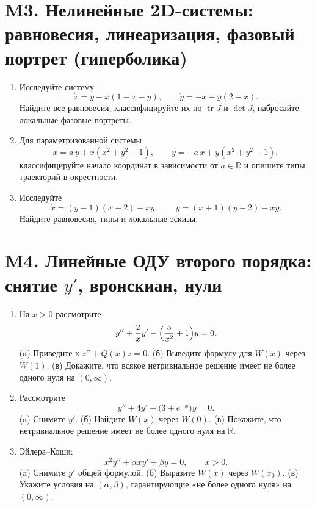 \documentclass[12pt]{article}
\begin{document}
\section*{M3. Нелинейные 2D-системы: равновесия, линеаризация, фазовый портрет (гиперболика)}
\begin{enumerate}
\item Исследуйте систему
\[
\dot x = y - x(1-x-y),\qquad
\dot y = -x + y(2-x).
\]
Найдите все равновесия, классифицируйте их по $\operatorname{tr}J$ и $\det J$, набросайте локальные фазовые портреты.

\item Для параметризованной системы
\[
\dot x = a\,y + x(x^2+y^2-1),\qquad
\dot y = -a\,x + y(x^2+y^2-1),
\]
классифицируйте начало координат в зависимости от $a\in\mathbb{R}$ и опишите типы траекторий в окрестности.

\item Исследуйте
\[
\dot x = (y-1)(x+2)-xy,\qquad
\dot y = (x+1)(y-2)-xy.
\]
Найдите равновесия, типы и локальные эскизы.
\end{enumerate}

\section*{M4. Линейные ОДУ второго порядка: снятие $y'$, вронскиан, нули}
\begin{enumerate}
\item На $x>0$ рассмотрите
\[
y''+\frac{2}{x}y' -\Bigl(\frac{5}{x^2}+1\Bigr)y=0.
\]
(a) Приведите к $z''+Q(x)z=0$. (б) Выведите формулу для $W(x)$ через $W(1)$. (в) Докажите, что всякое нетривиальное решение имеет не более одного нуля на $(0,\infty)$.

\item Рассмотрите
\[
y''+4y'+\bigl(3+e^{-x}\bigr)y=0.
\]
(a) Снимите $y'$. (б) Найдите $W(x)$ через $W(0)$. (в) Покажите, что нетривиальное решение имеет не более одного нуля на $\mathbb{R}$.

\item Эйлера--Коши:
\[
x^2y''+\alpha x y'+\beta y=0,\qquad x>0.
\]
(a) Снимите $y'$ общей формулой. (б) Выразите $W(x)$ через $W(x_0)$. (в) Укажите условия на $(\alpha,\beta)$, гарантирующие «не более одного нуля» на $(0,\infty)$.
\end{enumerate}

\end{document}
